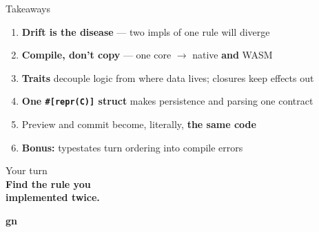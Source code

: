 \begin{frame}{Takeaways}
  \begin{enumerate}
    \item \textbf{Drift is the disease} --- two impls of one rule will diverge
    \pause
    \item \textbf{Compile, don't copy} --- one core $\rightarrow$ native \textbf{and} WASM
    \pause
    \item \textbf{Traits} decouple logic from where data lives; closures keep effects out
    \pause
    \item \textbf{One \texttt{\#[repr(C)]} struct} makes persistence and parsing one contract
    \pause
    \item Preview and commit become, literally, \textbf{the same code}
    \pause
    \item \textbf{Bonus:} typestates turn ordering into compile errors
  \end{enumerate}
\end{frame}

\begin{frame}[plain]
  \begin{center}
    \vfill
    {\large\color{stplmuted} Your turn}\\[0.45cm]
    {\Huge\bfseries\color{stplwhite} Find the rule you\\[0.2cm] implemented twice.}
    \vfill
  \end{center}
\end{frame}

\begin{frame}[plain]
  \begin{center}
    \vfill
    {\Huge\bfseries\color{stplwhite} gn}
    \vfill
  \end{center}
\end{frame}


